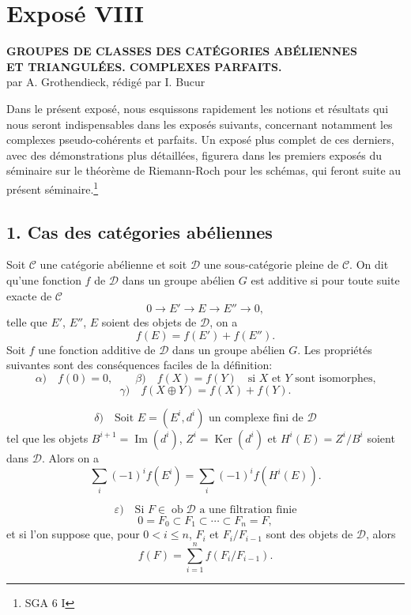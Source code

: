 \documentclass[11pt]{article}
\providecommand{\Ob}{\operatorname{ob}}
\providecommand{\cC}{\mathcal C}
\providecommand{\Ob}{\operatorname{ob}}
\providecommand{\cC}{\mathcal C}
\providecommand{\cD}{\mathcal D}
\providecommand{\Ob}{\operatorname{Ob}}
\providecommand{\Ob}{\operatorname{ob}}
\providecommand{\Ob}{\operatorname{Ob}}
\begin{document}
\newpage
\section*{Exposé VIII}

\begin{center}
\textbf{GROUPES DE CLASSES DES CATÉGORIES ABÉLIENNES}\\
\textbf{ET TRIANGULÉES. COMPLEXES PARFAITS.}\\[1ex]
par A. Grothendieck, rédigé par I. Bucur
\end{center}

Dans le présent exposé, nous esquissons rapidement les notions et résultats qui nous seront indispensables dans les exposés suivants, concernant notamment les complexes pseudo-cohérents et parfaits. Un exposé plus complet de ces derniers, avec des démonstrations plus détaillées, figurera dans les premiers exposés du séminaire sur le théorème de Riemann-Roch pour les schémas, qui feront suite au présent séminaire.\footnote{SGA 6 I}

\subsection*{1. Cas des catégories abéliennes}

Soit $\cC$ une catégorie abélienne et soit $\cD$ une sous-catégorie pleine de $\cC$. On dit qu'une fonction $f$ de $\cD$ dans un groupe abélien $G$ est additive si pour toute suite exacte de $\cC$
\[
0\longrightarrow E'\longrightarrow E\longrightarrow E''\longrightarrow 0,
\]
telle que $E'$, $E''$, $E$ soient des objets de $\cD$, on a
\[
f(E)=f(E')+f(E'').
\]
Soit $f$ une fonction additive de $\cD$ dans un groupe abélien $G$. Les propriétés suivantes sont des conséquences faciles de la définition:
\[
\alpha)\quad f(0)=0,\qquad
\beta)\quad f(X)=f(Y)\quad\text{si }X\text{ et }Y\text{ sont isomorphes,}
\]
\[
\gamma)\quad f(X\oplus Y)=f(X)+f(Y).
\]

\[
\delta)\quad
\text{Soit }E=(E^i,d^i)\text{ un complexe fini de }\cD
\]
tel que les objets $B^{i+1}=\operatorname{Im}(d^i)$, $Z^i=\operatorname{Ker}(d^i)$ et $H^i(E)=Z^i/B^i$ soient dans $\cD$. Alors on a
\[
\sum_i (-1)^i f(E^i)=\sum_i (-1)^i f(H^i(E)).
\]

\[
\varepsilon)\quad
\text{Si }F\in\Ob \cD\text{ a une filtration finie}
\]
\[
0=F_0\subset F_1\subset\cdots\subset F_n=F,
\]
et si l'on suppose que, pour $0<i\le n$, $F_i$ et $F_i/F_{i-1}$ sont des objets de $\cD$, alors
\[
f(F)=\sum_{i=1}^n f(F_i/F_{i-1}).
\]
\end{document}

